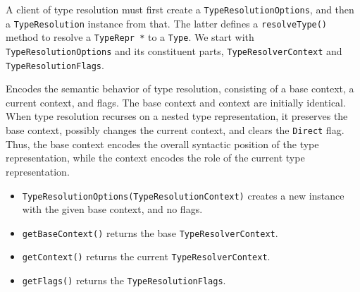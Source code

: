 \documentclass[../generics]{subfiles}
\begin{document}
A client of type resolution must first create a \texttt{TypeResolutionOptions}, and then a \texttt{TypeResolution} instance from that. The latter defines a \texttt{resolveType()} method to resolve a \texttt{TypeRepr *} to a \texttt{Type}. We start with \texttt{TypeResolutionOptions} and its constituent parts, \texttt{TypeResolverContext} and \texttt{TypeResolutionFlags}.

Encodes the semantic behavior of type resolution, consisting of a base context, a current context, and flags. The base context and context are initially identical. When type resolution recurses on a nested type representation, it preserves the base context, possibly changes the current context, and clears the \texttt{Direct} flag. Thus, the base context encodes the overall syntactic position of the type representation, while the context encodes the role of the current type representation.
\begin{itemize}
\item \texttt{TypeResolutionOptions(TypeResolutionContext)} creates a new instance with the given base context, and no flags.
\item \texttt{getBaseContext()} returns the base \texttt{TypeResolverContext}.
\item \texttt{getContext()} returns the current \texttt{TypeResolverContext}.
\item \texttt{getFlags()} returns the \texttt{TypeResolutionFlags}.
\end{itemize}
\end{document}
